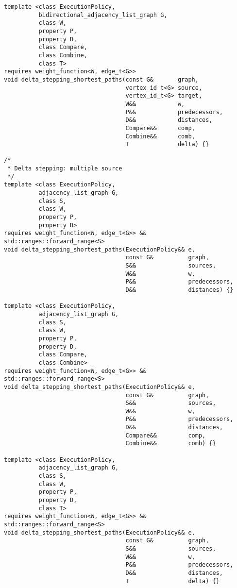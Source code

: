 \begin{lstlisting}
template <class ExecutionPolicy,
          bidirectional_adjacency_list_graph G,
          class W,
          property P,
          property D,
          class Compare,
          class Combine,
          class T>
requires weight_function<W, edge_t<G>>
void delta_stepping_shortest_paths(const G&       graph,
                                   vertex_id_t<G> source,
                                   vertex_id_t<G> target,
                                   W&&            w,
                                   P&&            predecessors,
                                   D&&            distances,
                                   Compare&&      comp,
                                   Combine&&      comb,
                                   T              delta) {}

/*
 * Delta stepping: multiple source
 */
template <class ExecutionPolicy,
          adjacency_list_graph G,
          class S,
          class W,
          property P,
          property D>
requires weight_function<W, edge_t<G>> && std::ranges::forward_range<S>
void delta_stepping_shortest_paths(ExecutionPolicy&& e,
                                   const G&          graph,
                                   S&&               sources,
                                   W&&               w,
                                   P&&               predecessors,
                                   D&&               distances) {}

template <class ExecutionPolicy,
          adjacency_list_graph G,
          class S,
          class W,
          property P,
          property D,
          class Compare,
          class Combine>
requires weight_function<W, edge_t<G>> && std::ranges::forward_range<S>
void delta_stepping_shortest_paths(ExecutionPolicy&& e,
                                   const G&          graph,
                                   S&&               sources,
                                   W&&               w,
                                   P&&               predecessors,
                                   D&&               distances,
                                   Compare&&         comp,
                                   Combine&&         comb) {}

template <class ExecutionPolicy,
          adjacency_list_graph G,
          class S,
          class W,
          property P,
          property D,
          class T>
requires weight_function<W, edge_t<G>> && std::ranges::forward_range<S>
void delta_stepping_shortest_paths(ExecutionPolicy&& e,
                                   const G&          graph,
                                   S&&               sources,
                                   W&&               w,
                                   P&&               predecessors,
                                   D&&               distances,
                                   T                 delta) {}


\end{lstlisting}
